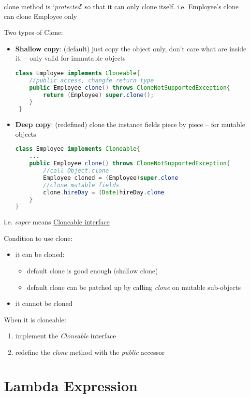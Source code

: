 \documentclass[12pt]{article}
\begin{document}
clone method is `\emph{protected}' so that it can only clone itself. i.e. Employee's clone can clone Employee only

Two types of Clone:
\begin{itemize}
    \item \textbf{Shallow copy}: (default) just copy the object only, don't care what are inside it. -- only valid for immutable objects
\begin{lstlisting}[language=Java]
class Employee implements Cloneable{
    //public access, changfe return type
    public Employee clone() throws CloneNotSupportedException{
        return (Employee) super.clone();
    }
 }
\end{lstlisting}

    \item \textbf{Deep copy}: (redefined) clone the instance fields piece by piece -- for mutable objects
\begin{lstlisting}[language=Java]
class Employee implements Cloneable{
    ...
    public Employee clone() throws CloneNotSupportedException{
        //call Object.clone
        Employee cloned = (Employee)super.clone
        //clone mutable fields
        clone.hireDay = (Date)hireDay.clone
    }
}
\end{lstlisting}
\end{itemize}
i.e. \emph{super} means \underline{Cloneable interface}

Condition to use clone:
\begin{itemize}
    \item it can be cloned:
    \begin{itemize}
        \item default clone is good enough (shallow clone)
        \item default clone can be patched up by calling \emph{clone} on mutable sub-objects
    \end{itemize}
    \item it cannot be cloned
\end{itemize}

When it is cloneable:
\begin{enumerate}
    \item implement the \emph{Cloneable} interface
    \item redefine the \emph{clone} method with the \emph{public} accessor
\end{enumerate}

\section{Lambda Expression}
\end{document}
